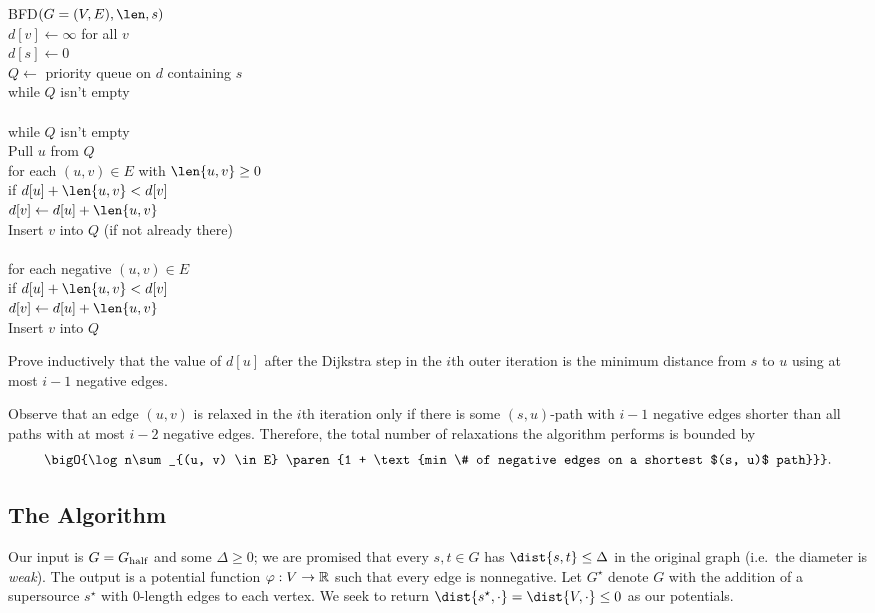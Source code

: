\documentclass[12pt]{article}
\begin{document}
\begin{centeralgo}
  \textsc{BFD}$(G = (V, E), \len, s)$\+
  \\  $d[v] \gets \infty$ for all $v$
  \\  $d[s] \gets 0$
  \\  $Q \gets $ priority queue on $d$ containing $s$
  \\  while $Q$ isn't empty\+
  \\    
  \\    while $Q$ isn't empty\+
  \\      Pull $u$ from $Q$
  \\      for each $(u, v) \in E$ with $\len{u, v} \geq 0$\+
  \\        if $d[u] + \len{u, v} < d[v]$\+
  \\            $d[v] \gets d[u] + \len{u, v}$
  \\            Insert $v$ into $Q$ (if not already there)\-\-\-
  \\    
  \\    for each negative $(u, v) \in E$\+
  \\      if $d[u] + \len{u, v} < d[v]$\+
  \\        $d[v] \gets d[u] + \len{u, v}$
  \\        Insert $v$ into $Q$
\end{centeralgo}
\begin{exercise}
  Prove inductively that the value of $d[u]$ after the Dijkstra step in the
  $i$th outer iteration is the minimum distance from $s$ to $u$ using at most
  $i - 1$ negative edges.
\end{exercise}
Observe that an edge $(u, v)$ is relaxed in the $i$th iteration only if there is
some $(s, u)$-path with $i - 1$ negative edges shorter than all paths with at
most $i - 2$ negative edges. Therefore, the total number of relaxations the
algorithm performs is bounded by
\[
  \bigO{\log n\sum_{(u, v) \in E} \paren{1 + \text{min \# of negative edges on a
        shortest $(s, u)$ path}}}.
\]

\subsection{The Algorithm}

Our input is $G = G_{\text{half}}$ and some $\Delta \geq 0$; we are promised that every
$s, t \in G$ has $\dist{s, t} \leq \Delta$ in the original graph (i.e.\ the
diameter is \emph{weak}). The output is a potential function
$\varphi : V \to \mathbb{R}$ such that every edge is nonnegative. Let $G^\star$ denote
$G$ with the addition of a supersource $s^\star$ with $0$-length edges to each
vertex. We seek to return $\dist{s^\star, \cdot} = \dist{V, \cdot} \leq 0$ as
our potentials.
\end{document}
